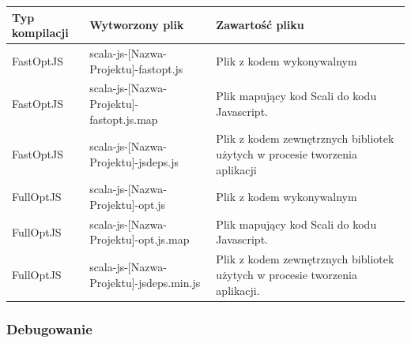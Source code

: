 \begin{center}
\begin{tabular}{| l | l | p{8cm} |}
\hline
Typ kompilacji & Wytworzony plik & Zawartość pliku \\ \hline
FastOptJS & scala-js-[Nazwa-Projektu]-fastopt.js & Plik z kodem wykonywalnym \\ \hline

FastOptJS & scala-js-[Nazwa-Projektu]-fastopt.js.map & Plik mapujący kod Scali do kodu Javascript. \\ \hline

FastOptJS & scala-js-[Nazwa-Projektu]-jsdeps.js & Plik z kodem zewnętrznych bibliotek użytych w procesie tworzenia aplikacji \\ \hline

 \hline \hline

FullOptJS & scala-js-[Nazwa-Projektu]-opt.js & Plik z kodem wykonywalnym \\ \hline

FullOptJS & scala-js-[Nazwa-Projektu]-opt.js.map & Plik mapujący kod Scali do kodu Javascript. \\ \hline

FullOptJS & scala-js-[Nazwa-Projektu]-jsdeps.min.js & Plik z kodem zewnętrznych bibliotek użytych w procesie tworzenia aplikacji. \\ \hline
\hline
\end{tabular}
\end{center}
\subsubsection{Debugowanie}


